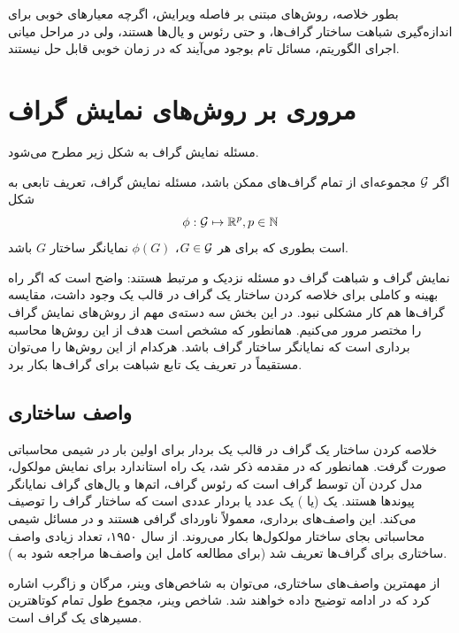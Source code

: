 بطور خلاصه، روش‌های مبتنی بر فاصله ویرایش، اگرچه معیارهای خوبی برای اندازه‌گیری شباهت ساختار گراف‌ها، و حتی رئوس و یال‌ها هستند، ولی در مراحل میانی اجرای الگوریتم، مسائل  تام بوجود می‌آیند که در زمان خوبی قابل حل نیستند.

\section{مروری بر روش‌های نمایش گراف}\label{sec:graph_representation}
مسئله نمایش گراف به شکل زیر مطرح می‌شود.
\begin{definition}
اگر $\mathcal{G}$ مجموعه‌ای از تمام گراف‌های ممکن باشد، مسئله نمایش گراف‌، تعریف تابعی به شکل
\begin{equation*}
\phi:\mathcal{G} \mapsto \mathbb{R}^p, p \in \mathbb{N}
\end{equation*}
است بطوری که برای هر $G \in \mathcal{G}$،
 $\phi(G)$
  نمایانگر ساختار $G$ باشد.
\end{definition}

نمایش گراف و شباهت گراف دو مسئله نزدیک و مرتبط هستند: واضح است که اگر راه بهینه و کاملی برای خلاصه کردن ساختار یک گراف در قالب یک  وجود داشت، مقایسه گراف‌ها هم کار مشکلی نبود. در این بخش سه دسته‌ی مهم از روش‌های نمایش گراف را مختصر مرور می‌کنیم. همانطور که مشخص است هدف از این روش‌ها محاسبه برداری است که نمایانگر ساختار گراف باشد. هرکدام از این روش‌ها را می‌توان مستقیماً در تعریف یک تابع شباهت برای گراف‌ها بکار برد.

\subsection{واصف ساختاری}
خلاصه کردن ساختار یک گراف در قالب یک بردار برای اولین بار در شیمی محاسباتی صورت گرفت‌. همانطور که در مقدمه ذکر شد، یک راه استاندارد برای نمایش مولکول، مدل کردن آن توسط گراف است که رئوس گراف، اتم‌ها و یال‌های گراف نمایانگر پیوندها هستند. یک (یا ) یک عدد یا بردار عددی است که ساختار گراف را توصیف می‌کند. این واصف‌های برداری، معمولاً  ناوردای گرافی هستند و در مسائل شیمی محاسباتی بجای ساختار مولکول‌ها بکار می‌روند. از سال ۱۹۵۰، تعداد زیادی واصف ساختاری برای گراف‌ها تعریف شد (برای مطالعه کامل این واصف‌ها مراجعه شود به ).

از مهمترین واصف‌های ساختاری، می‌توان به شاخص‌های وینر، مرگان و زاگرب اشاره کرد که در ادامه توضیح داده خواهند شد. شاخص وینر، مجموع طول تمام کوتاهترین مسیرهای یک گراف است.

